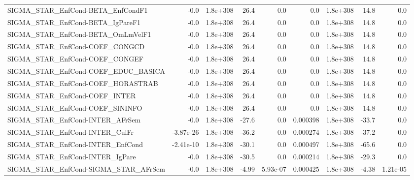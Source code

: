 \begin{tabular}{lrrrrrrrr}
SIGMA\_STAR\_EnfCond-BETA\_EnfCondF1     &        -0.0 &     1.8e+308 &    26.4 &      0.0 &        0.0 &    1.8e+308 &         14.8 &           0.0 \\
SIGMA\_STAR\_EnfCond-BETA\_IgPareF1      &        -0.0 &     1.8e+308 &    26.4 &      0.0 &        0.0 &    1.8e+308 &         14.8 &           0.0 \\
SIGMA\_STAR\_EnfCond-BETA\_OmLmVelF1     &        -0.0 &     1.8e+308 &    26.4 &      0.0 &        0.0 &    1.8e+308 &         14.8 &           0.0 \\
SIGMA\_STAR\_EnfCond-COEF\_CONGCD        &        -0.0 &     1.8e+308 &    26.4 &      0.0 &        0.0 &    1.8e+308 &         14.8 &           0.0 \\
SIGMA\_STAR\_EnfCond-COEF\_CONGEF        &        -0.0 &     1.8e+308 &    26.4 &      0.0 &        0.0 &    1.8e+308 &         14.8 &           0.0 \\
SIGMA\_STAR\_EnfCond-COEF\_EDUC\_BASICA   &        -0.0 &     1.8e+308 &    26.4 &      0.0 &        0.0 &    1.8e+308 &         14.8 &           0.0 \\
SIGMA\_STAR\_EnfCond-COEF\_HORASTRAB     &        -0.0 &     1.8e+308 &    26.4 &      0.0 &        0.0 &    1.8e+308 &         14.8 &           0.0 \\
SIGMA\_STAR\_EnfCond-COEF\_INTER         &        -0.0 &     1.8e+308 &    26.4 &      0.0 &        0.0 &    1.8e+308 &         14.8 &           0.0 \\
SIGMA\_STAR\_EnfCond-COEF\_SININFO       &        -0.0 &     1.8e+308 &    26.4 &      0.0 &        0.0 &    1.8e+308 &         14.8 &           0.0 \\
SIGMA\_STAR\_EnfCond-INTER\_AFrSem       &        -0.0 &     1.8e+308 &   -27.6 &      0.0 &   0.000398 &    1.8e+308 &        -33.7 &           0.0 \\
SIGMA\_STAR\_EnfCond-INTER\_CulFr        &   -3.87e-26 &     1.8e+308 &   -36.2 &      0.0 &   0.000274 &    1.8e+308 &        -37.2 &           0.0 \\
SIGMA\_STAR\_EnfCond-INTER\_EnfCond      &   -2.41e-10 &     1.8e+308 &   -30.1 &      0.0 &   0.000497 &    1.8e+308 &        -65.6 &           0.0 \\
SIGMA\_STAR\_EnfCond-INTER\_IgPare       &        -0.0 &     1.8e+308 &   -30.5 &      0.0 &   0.000214 &    1.8e+308 &        -29.3 &           0.0 \\
SIGMA\_STAR\_EnfCond-SIGMA\_STAR\_AFrSem  &        -0.0 &     1.8e+308 &   -4.99 & 5.93e-07 &   0.000425 &    1.8e+308 &        -4.38 &      1.21e-05 \\

\end{tabular}
